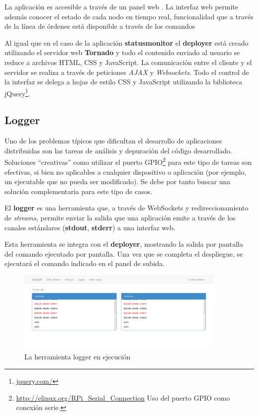 La aplicación es accesible a través de un panel web %
. La interfaz web permite además conocer el estado de cada nodo en tiempo real, funcionalidad que a través de la línea de órdenes está disponible a través de los comandos %

Al igual que en el caso de la aplicación \textbf{statusmonitor} el \textbf{deployer} está creado utilizando el servidor web \textbf{Tornado} y todo el contenido enviado al usuario se reduce a archivos HTML, CSS y JavaScript. La comunicación entre el cliente y el servidor se realiza a través de peticiones \textit{AJAX} y \textit{Websockets}. Todo el control de la interfaz se delega a hojas de estilo CSS y JavaScript utilizando la biblioteca jQuery\footnote{\href{https://jquery.com/}{jquery.com/}}.


\subsection{Logger}

Uno de los problemas típicos que dificultan el desarrollo de aplicaciones distribuidas son las tareas de análisis y depuración del código desarrollado. Soluciones ``creativas'' como utilizar el puerto GPIO\footnote{\href{http://elinux.org/RPi\_Serial\_Connection}{http://elinux.org/RPi\_Serial\_Connection} Uso del puerto GPIO como conexión serie.} para este tipo de tareas son efectivas, si bien no aplicables a cualquier dispositivo o aplicación (por ejemplo, un ejecutable que no pueda ser modificado). Se debe por tanto buscar una solución complementaria para este tipo de casos.

El \textbf{logger} es una herramienta que, a través de WebSockets y redireccionamiento de \textit{streams}, permite enviar la salida que una aplicación emite a través de los canales estándares (\textbf{stdout}, \textbf{stderr}) a una interfaz web.

Esta herramienta se integra con el \textbf{deployer}, mostrando la salida por pantalla del comando ejecutado por pantalla. Una vez que se completa el despliegue, se ejecutará el comando indicado en el panel de subida.

\begin{figure}[H]
\centering
\includegraphics[width=0.9\textwidth]{Chapters/Chapter5/Figures/loggermain}
\caption[La herramienta logger en ejecución]{La herramienta logger en ejecución}
\end{figure}

